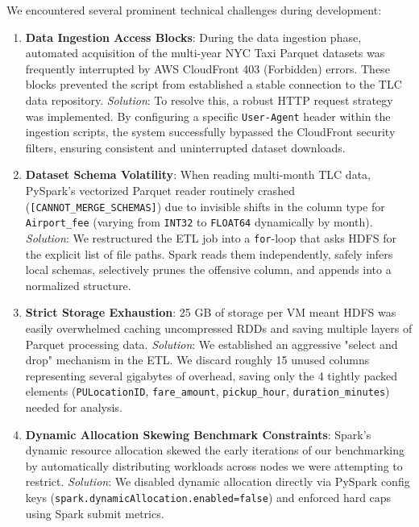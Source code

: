 We encountered several prominent technical challenges during development:
\begin{enumerate}
    \item \textbf{Data Ingestion Access Blocks}: During the data ingestion phase, automated acquisition of the multi-year NYC Taxi Parquet datasets was frequently interrupted by AWS CloudFront 403 (Forbidden) errors. These blocks prevented the script from established a stable connection to the TLC data repository.
    \textit{Solution}: To resolve this, a robust HTTP request strategy was implemented. By configuring a specific \texttt{User-Agent} header within the ingestion scripts, the system successfully bypassed the CloudFront security filters, ensuring consistent and uninterrupted dataset downloads.
    \item \textbf{Dataset Schema Volatility}: When reading multi-month TLC data, PySpark's vectorized Parquet reader routinely crashed (\texttt{[CANNOT\_MERGE\_SCHEMAS]}) due to invisible shifts in the column type for \texttt{Airport\_fee} (varying from \texttt{INT32} to \texttt{FLOAT64} dynamically by month). 
    \textit{Solution}: We restructured the ETL job into a \texttt{for}-loop that asks HDFS for the explicit list of file paths. Spark reads them independently, safely infers local schemas, selectively prunes the offensive column, and appends into a normalized structure.
    \item \textbf{Strict Storage Exhaustion}: 25 GB of storage per VM meant HDFS was easily overwhelmed caching uncompressed RDDs and saving multiple layers of Parquet processing data.
    \textit{Solution}: We established an aggressive "select and drop" mechanism in the ETL. We discard roughly 15 unused columns representing several gigabytes of overhead, saving only the 4 tightly packed elements (\texttt{PULocationID}, \texttt{fare\_amount}, \texttt{pickup\_hour}, \texttt{duration\_minutes}) needed for analysis.
    \item \textbf{Dynamic Allocation Skewing Benchmark Constraints}: Spark's dynamic resource allocation skewed the early iterations of our benchmarking by automatically distributing workloads across nodes we were attempting to restrict. 
    \textit{Solution}: We disabled dynamic allocation directly via PySpark config keys (\texttt{spark.dynamicAllocation.enabled=false}) and enforced hard caps using Spark submit metrics.
\end{enumerate}